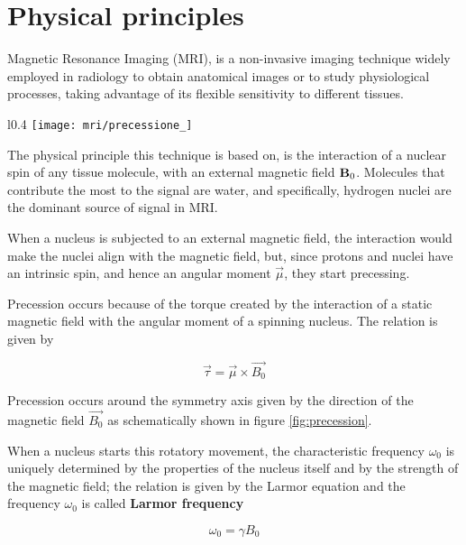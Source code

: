 \documentclass[11pt]{report}
\begin{document}
\section{Physical principles}\label{sec:mri_introduction}
Magnetic Resonance Imaging (MRI), is a non-invasive imaging technique widely employed in radiology to obtain anatomical images or to study physiological processes, taking advantage of its flexible sensitivity to different tissues.

\begin{wrapfigure}[25]{l}{0.4\textwidth}
\centering
\texttt{[image: mri/precessione\_]}
\caption{Representation of a angular moment vector $\vec{\mu}$ under a static magnetic field $\vec{B_0}$ and the resulting moment $\vec{\tau}$  which causes the precession}
\label{fig:precession}
\end{wrapfigure}


The physical principle this technique is based on, is the interaction of a nuclear spin of any tissue molecule, with an external magnetic field $\textbf B_0$.
Molecules that contribute the most to the signal are water, and specifically, hydrogen nuclei are the dominant source of signal in MRI.

When a nucleus is subjected to an external magnetic field, the interaction would make the nuclei align with the magnetic field, but, since protons and nuclei have an intrinsic spin, and hence an angular moment $\overrightarrow{\mu}$, they start precessing.

Precession occurs because of the torque created by the interaction of a static magnetic field with the angular moment of a spinning nucleus.
The relation is given by

\begin{equation}
\overrightarrow{\tau} = \overrightarrow{\mu} \times \overrightarrow{B_0}
\end{equation}

Precession occurs around the symmetry axis given by the direction of the magnetic field $\overrightarrow{B_0}$ as schematically shown in figure \ref{fig:precession}.

When a nucleus starts this rotatory movement, the characteristic frequency $\omega_0$ is uniquely determined by the properties of the nucleus itself and by the strength of the magnetic field; the relation is given by the Larmor equation and the frequency $\omega_0$ is called \textbf{Larmor frequency}

\begin{equation}\label{eq:Larmorfrequency}
\omega_0 = \gamma B_0
\end{equation}
\end{document}
